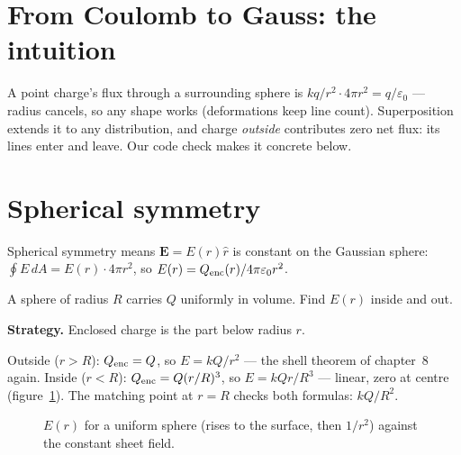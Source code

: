 \section{From Coulomb to Gauss: the intuition}\label{sec:ga-deriv}

A point charge's flux through a surrounding sphere is
$kq/r^{2}\cdot4\pi r^{2}=q/\varepsilon_0$ --- radius cancels, so any
shape works (deformations keep line count). Superposition extends it to
any distribution, and charge \emph{outside} contributes zero net flux:
its lines enter and leave. Our code check makes it concrete below.

\section{Spherical symmetry}\label{sec:ga-sphere}

Spherical symmetry means $\mathbf E=E(r)\hat r$ is constant on the
Gaussian sphere: $\oint E\,dA=E(r)\cdot4\pi r^{2}$, so
$E(r)=Q_{\rm enc}(r)/4\pi\varepsilon_0r^{2}$.

\begin{example}\label{ex:sphere}
A sphere of radius $R$ carries $Q$ uniformly in volume. Find $E(r)$
inside and out.
\par\smallskip
\textbf{Strategy.} Enclosed charge is the part below radius $r$.
\begin{solution}
Outside ($r>R$): $Q_{\rm enc}=Q$, so $E=kQ/r^{2}$ --- the shell theorem
of chapter~8 again.
Inside ($r<R$): $Q_{\rm enc}=Q(r/R)^{3}$, so
$E=kQr/R^{3}$ --- linear, zero at centre (figure~\ref{fig:er}).
The matching point at $r=R$ checks both formulas: $kQ/R^{2}$.
\checkmark
\end{solution}
\end{example}

\begin{figure}[htbp]\centering

\caption{$E(r)$ for a uniform sphere (rises to the surface, then
$1/r^{2}$) against the constant sheet field.}
\label{fig:er}
\end{figure}

